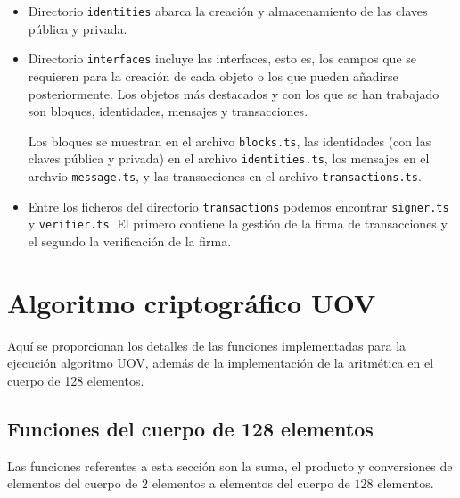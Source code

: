 \begin{itemize}
	\begin{lstlisting}[language=Python,caption=Estructura archivo data.json, label=cod:data-json]
		{
			"id":
			"pub_schnorr":
			"priv_schnorr":
			"priv_alpha_UOV": 
			"priv_beta_OUV": 
			"pub_alpha_UOV": 
			"pub_beta_OUV": 
		}
	\end{lstlisting}
	
	\begin{lstlisting}[language=Python,caption=Estructura archivo signature.json, label=cod:sign-json]
		{
			"hex":
			"vector":
		}
	\end{lstlisting}
	
	\item Directorio \texttt{identities} abarca la creación y almacenamiento de las claves pública y privada.
	\item Directorio \texttt{interfaces} incluye las interfaces, esto es, los campos que se requieren para la creación de cada objeto o los que pueden añadirse posteriormente. Los objetos más destacados y con los que se han trabajado son bloques, identidades, mensajes y transacciones.
	
	Los bloques se muestran en el archivo \texttt{blocks.ts}, las identidades (con las claves pública y privada) en el archivo \texttt{identities.ts}, los mensajes en el archvio \texttt{message.ts}, y las transacciones en el archivo \texttt{transactions.ts}.
	\item Entre los ficheros del directorio \texttt{transactions} podemos encontrar \texttt{signer.ts} y \texttt{verifier.ts}. El primero contiene la gestión de la firma de transacciones y el segundo la verificación de la firma.
\end{itemize}


\newpage

\section{Algoritmo criptográfico UOV}\label{sec:impl:alg}
Aquí se proporcionan los detalles de las funciones implementadas para la ejecución algoritmo UOV, además de la implementación de la aritmética en el cuerpo de 128 elementos.\\

\subsection{Funciones del cuerpo de 128 elementos}
Las funciones referentes a esta sección son la suma, el producto y conversiones de elementos del cuerpo de $2$ elementos a elementos del cuerpo de $128$ elementos.\\

